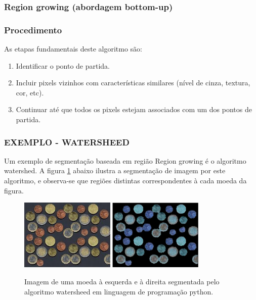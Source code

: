 \subsubsection{Region growing (abordagem bottom-up)}
\subsubsection*{Procedimento}
As etapas fundamentais deste algoritmo são: 
\begin{enumerate}
    \item Identificar o ponto de partida.
    \item Incluir pixels vizinhos com características similares (nível de cinza, textura, cor, etc).
    \item Continuar até que todos os pixels estejam associados com um dos pontos de partida.
\end{enumerate}

\subsubsection*{EXEMPLO - WATERSHEED}
Um exemplo de segmentação baseada em região Region growing é o algoritmo watershed. A figura \ref{fig:coins} abaixo ilustra a segmentação de imagem por este algoritmo, e observa-se que regiões distintas correspondentes à cada moeda da figura.

\begin{figure}[!htb]
 \centering
 \def\baselinestretch{1}\small\normalsize
 \includegraphics[width=0.4\textwidth]{img/stf-coins.jpg}\qquad
 \includegraphics[width=0.4\textwidth]{img/stf-coins-watersheed.jpg} 
 \caption{\label{fig:coins}Imagem de uma moeda \citep{stanford} à esquerda e à direita segmentada pelo algoritmo watersheed em linguagem de programação python.}
\end{figure}
 
